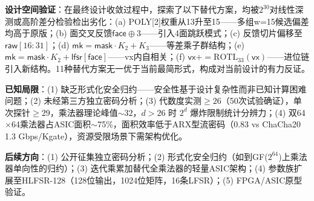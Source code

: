 \documentclass[11pt,a4paper]{ctexart}
\begin{document}
\textbf{设计空间验证}：在最终设计收敛过程中，探索了以下替代方案，均被$2^{30}$对线性深测或高阶差分检验检出劣化：(a) POLY[2]权重从13升至15——多组w=15候选偏差均高于原版；(b) 面交叉反馈$\mathsf{face}\oplus3$——引入4面跳跃模式；(c) 反馈切片偏移至$\mathsf{raw}[16:31]$；(d) $\mathsf{mk}=\mathsf{mask}\cdot K_2+K_3$——等差乘子群结构；(e) $\mathsf{mk}=\mathsf{mask}\cdot K_2+\mathsf{lfsr}[\mathsf{face}]$——vx内自相关；(f) $\mathsf{vx}+=\mathrm{ROTL}_{33}(\mathsf{vx})$——进位链引入新结构。11种替代方案无一优于当前最简形式，构成对当前设计的有力反证。

\textbf{已知局限}：(1) 缺乏形式化安全归约——安全性基于设计复杂性而非已知计算困难问题；(2) 未经第三方独立密码分析；(3) 代数度实测$\ge 26$（50次试验确证），单次探针$\ge 29$，乘法器理论峰值$\sim 32$，$d>26$ 时 $2^d$ 爆炸限制统计分辨力；(4) 双64$\times$64乘法器占ASIC面积$\sim$75\%，面积效率低于ARX型流密码（0.83 vs ChaCha20 1.3 Gbps/Kgate），资源受限场景下需架构优化。

\textbf{后续方向}：(1) 公开征集独立密码分析；(2) 形式化安全归约（如到GF($2^{64}$)上乘法器单向性的归约）；(3) 迭代乘累加替代全乘法器的轻量ASIC架构；(4) 参数族扩展至HLFSR-128（128位输出，1024位矩阵，16条LFSR）；(5) FPGA/ASIC原型验证。
\end{document}
